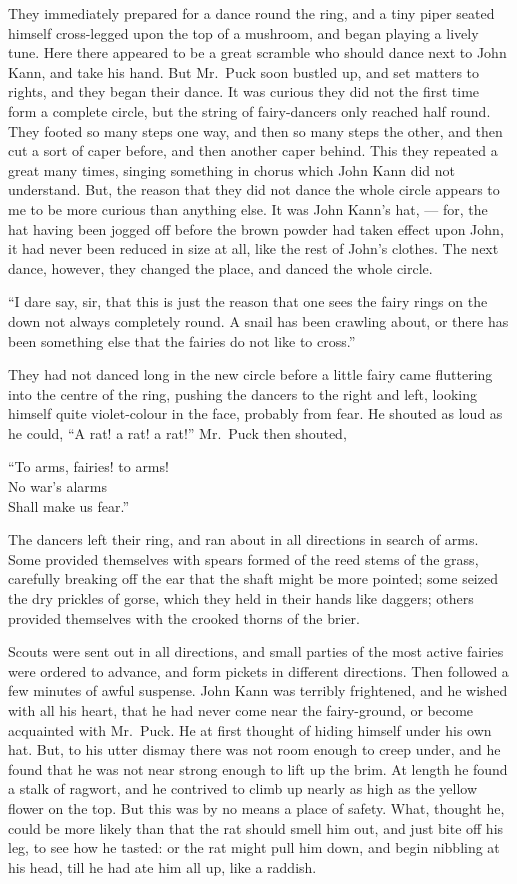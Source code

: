 \documentclass[
  12pt,
  a5paper,
  twoside]{book}
\begin{document}
They immediately prepared for a dance round the ring, and a tiny piper
seated himself cross-legged upon the top of a mushroom, and began
playing a lively tune. Here there appeared to be a great scramble who
should dance next to John Kann, and take his hand. But Mr.~Puck soon
bustled up, and set matters to rights, and they began their dance. It
was curious they did not the first time form a complete circle, but the
string of fairy-dancers only reached half round. They footed so many
steps one way, and then so many steps the other, and then cut a sort of
caper before, and then another caper behind. This they repeated a great
many times, singing something in chorus which John Kann did not
understand. But, the reason that they did not dance the whole circle
appears to me to be more curious than anything else. It was John Kann's
hat, --- for, the hat having been jogged off before the brown powder had
taken effect upon John, it had never been reduced in size at all, like
the rest of John's clothes. The next dance, however, they changed the
place, and danced the whole circle.

``I dare say, sir, that this is just the reason that one sees the fairy
rings on the down not always completely round. A snail has been crawling
about, or there has been something else that the fairies do not like to
cross.''

They had not danced long in the new circle before a little fairy came
fluttering into the centre of the ring, pushing the dancers to the right
and left, looking himself quite violet-colour in the face, probably from
fear. He shouted as loud as he could, ``A rat! a rat! a rat!'' Mr.~Puck
then shouted,

``To arms, fairies! to arms!\\
No war's alarms\\
Shall make us fear.''

The dancers left their ring, and ran about in all directions in search
of arms. Some provided themselves with spears formed of the reed stems
of the grass, carefully breaking off the ear that the shaft might be
more pointed; some seized the dry prickles of gorse, which they held in
their hands like daggers; others provided themselves with the crooked
thorns of the brier.

Scouts were sent out in all directions, and small parties of the most
active fairies were ordered to advance, and form pickets in different
directions. Then followed a few minutes of awful suspense. John Kann was
terribly frightened, and he wished with all his heart, that he had never
come near the fairy-ground, or become acquainted with Mr.~Puck. He at
first thought of hiding himself under his own hat. But, to his utter
dismay there was not room enough to creep under, and he found that he
was not near strong enough to lift up the brim. At length he found a
stalk of ragwort, and he contrived to climb up nearly as high as the
yellow flower on the top. But this was by no means a place of safety.
What, thought he, could be more likely than that the rat should smell
him out, and just bite off his leg, to see how he tasted: or the rat
might pull him down, and begin nibbling at his head, till he had ate him
all up, like a raddish.
\end{document}
